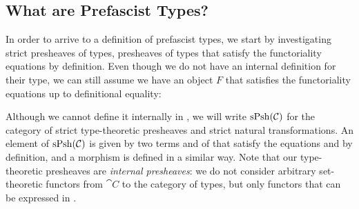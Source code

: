 \subsection{What are Prefascist Types?}

In order to arrive to a definition of prefascist types, we start by 
investigating strict presheaves of types, \ie presheaves of types that satisfy 
the functoriality equations by definition. 
% 
Even though we do not have an internal definition for their type, we can still 
assume we have an object \( F \) that satisfies the functoriality equations up 
to definitional equality:


Although we cannot define it internally in \MLTT, we will write 
\( \mathrm{sPsh}(\mathcal{C}) \) for the category of strict type-theoretic presheaves
and strict natural transformations.
An element of \( \mathrm{sPsh}(\mathcal{C}) \) is given by two terms 
 and  of \MLTT that satisfy the equations  and 
 by definition, and a morphism is defined in a similar way.
Note that our type-theoretic presheaves are \emph{internal presheaves}: we
do not consider arbitrary set-theoretic functors from \( \cat{C} \) to the
category of types, but only functors that can be expressed in \MLTT.


